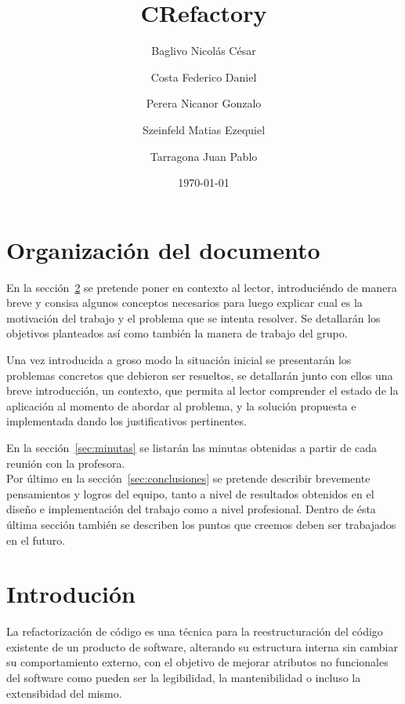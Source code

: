 \documentclass[a4paper,oneside,12pt]{article}
\begin{document}

\title{CRefactory}
\author{Baglivo Nicol\'as C\'esar \and Costa Federico Daniel \and Perera Nicanor Gonzalo \and Szeinfeld Matias Ezequiel \and Tarragona Juan Pablo}
\date{\today}
\maketitle

\tableofcontents

\newpage

\section{Organizaci\'on del documento}
En la secci\'on~\ref{sec:intro} se pretende poner en contexto al lector, introduci\'endo de manera breve y consisa algunos conceptos necesarios para luego explicar cual es la motivaci\'on del trabajo y el problema que se intenta resolver. Se detallar\'an los objetivos planteados as\'i como tambi\'en la manera de trabajo del grupo.

Una vez introducida a groso modo la situaci\'on inicial se presentar\'an los problemas concretos que debieron ser resueltos, se detallar\'an junto con ellos una breve introducci\'on, un contexto, que permita al lector comprender el estado de la aplicaci\'on al momento de abordar al problema, y la soluci\'on propuesta e implementada dando los justificativos pertinentes.

En la secci\'on~\ref{sec:minutas} se listar\'an las minutas obtenidas a partir de cada reuni\'on con la profesora. \\
Por \'ultimo en la secci\'on~\ref{sec:conclusiones} se pretende describir brevemente pensamientos y logros del equipo, tanto a nivel de resultados obtenidos en el diseño e implementaci\'on del trabajo como a nivel profesional. Dentro de \'esta \'ultima secci\'on tambi\'en se describen los puntos que creemos deben ser trabajados en el futuro.

\section{Introduci\'on}
\label{sec:intro}
La refactorizaci\'on de c\'odigo es una t\'ecnica para la reestructuraci\'on del c\'odigo existente de un producto de software, alterando su estructura interna sin cambiar su comportamiento externo, con el objetivo de mejorar atributos no funcionales del software como pueden ser la legibilidad, la mantenibilidad o incluso la extensibidad del mismo.
\end{document}
